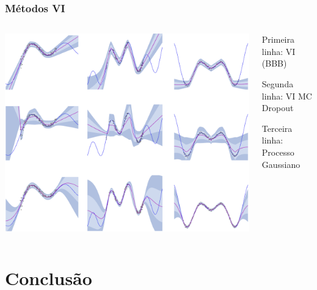 \documentclass{beamer}
\begin{document}
\begin{frame}
    \frametitle{Métodos VI}

    \begin{columns}[c] %
        \begin{column}{0.75\textwidth}
            \includegraphics[width=\linewidth]{compare.png} %
        \end{column}
        \begin{column}{0.25\textwidth}
            Primeira linha: VI (BBB)
            \break

            Segunda linha: VI MC Dropout
            \break

            Terceira linha: Processo Gaussiano
        \end{column}
    \end{columns}

\end{frame}

\section{Conclusão}
\end{document}
